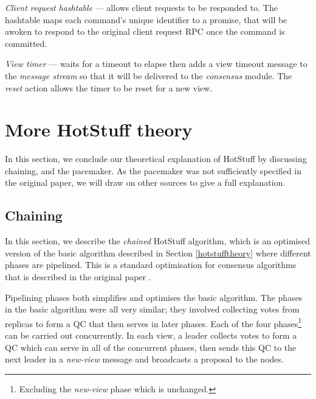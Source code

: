 \begin{description}
	\item \textit{Client request hashtable} --- allows client requests to be responded to. The hashtable maps each command's unique identifier to a promise, that will be awoken to respond to the original client request RPC once the command is committed.
	\item \textit{View timer} --- waits for a timeout to elapse then adds a view timeout message to the \textit{message stream} so that it will be delivered to the \textit{consensus} module. The \textit{reset} action allows the timer to be reset for a new view.
\end{description}

\section{More HotStuff theory} \label{moretheory}
In this section, we conclude our theoretical explanation of HotStuff by discussing chaining, and the pacemaker. As the pacemaker was not sufficiently specified in the original paper, we will draw on other sources to give a full explanation.

\subsection{Chaining} \label{chaining}

In this section, we describe the \textit{chained} HotStuff algorithm, which is an optimised version of the basic algorithm described in Section \ref{hotstufftheory} where different phases are pipelined. This is a standard optimisation for consensus algorithms that is described in the original paper \cite{yinHotStuffBFTConsensus2019}.

Pipelining phases both simplifies and optimises the basic algorithm. The phases in the basic algorithm were all very similar; they involved collecting votes from replicas to form a QC that then serves in later phases. Each of the four phases\footnote{Excluding the \textit{new-view} phase which is unchanged.} can be carried out concurrently. In each view, a leader collects votes to form a QC which can serve in all of the concurrent phases, then sends this QC to the next leader in a \textit{new-view} message and broadcasts a proposal to the nodes. 



